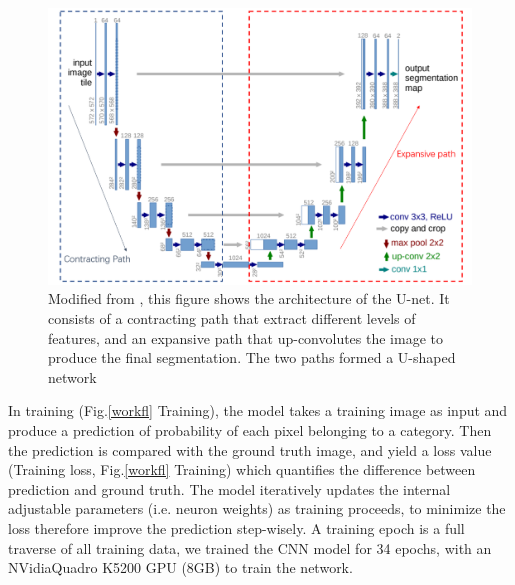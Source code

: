 \documentclass[draft,linenumbers]{agujournal2018}
\begin{document}
\begin{figure}[h]
\centering
\includegraphics[width=33pc]{imgs/unet.png}
\caption{Modified from \citet{ronneberger2015u}, this figure shows the architecture of the U-net. It consists of a contracting path that extract different levels of features, and an expansive path that up-convolutes the image to produce the final segmentation. The two paths formed a U-shaped network}
\label{unet}
\end{figure}

In training (Fig.\ref{workfl} Training), the model takes a training image as input and produce a prediction of probability of each pixel belonging to a category. Then the prediction is compared with the ground truth image, and yield a loss value (Training loss, Fig.\ref{workfl} Training) which quantifies the difference between prediction and ground truth. The model iteratively updates the internal adjustable parameters (i.e. neuron weights) as training proceeds, to minimize the loss therefore improve the prediction step-wisely. A training epoch is a full traverse of all training data, we trained the CNN model for 34 epochs, with an NVidia\texttrademark Quadro K5200 GPU (8GB) to train the network. 
\end{document}
